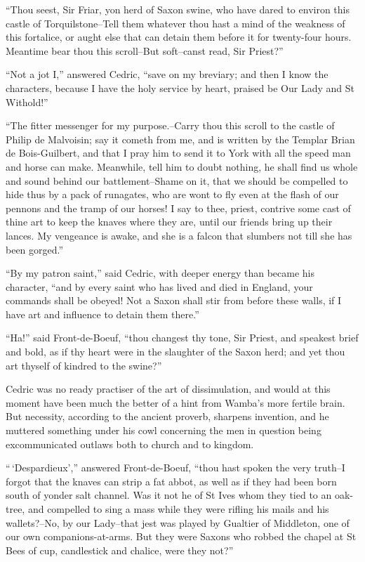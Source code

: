 ``Thou seest, Sir Friar, yon herd of Saxon swine, who have dared to
environ this castle of Torquilstone--Tell them whatever thou hast a mind
of the weakness of this fortalice, or aught else that can detain them
before it for twenty-four hours. Meantime bear thou this scroll--But
soft--canst read, Sir Priest?''

``Not a jot I,'' answered Cedric, ``save on my breviary; and then I know
the characters, because I have the holy service by heart, praised be Our
Lady and St Withold!''

``The fitter messenger for my purpose.--Carry thou this scroll to the
castle of Philip de Malvoisin; say it cometh from me, and is written by
the Templar Brian de Bois-Guilbert, and that I pray him to send it to
York with all the speed man and horse can make. Meanwhile, tell him to
doubt nothing, he shall find us whole and sound behind our
battlement--Shame on it, that we should be compelled to hide thus by a
pack of runagates, who are wont to fly even at the flash of our pennons
and the tramp of our horses! I say to thee, priest, contrive some cast
of thine art to keep the knaves where they are, until our friends bring
up their lances. My vengeance is awake, and she is a falcon that
slumbers not till she has been gorged.''

``By my patron saint,'' said Cedric, with deeper energy than became his
character, ``and by every saint who has lived and died in England, your
commands shall be obeyed! Not a Saxon shall stir from before these
walls, if I have art and influence to detain them there.''

``Ha!'' said Front-de-Boeuf, ``thou changest thy tone, Sir Priest, and
speakest brief and bold, as if thy heart were in the slaughter of the
Saxon herd; and yet thou art thyself of kindred to the swine?''

Cedric was no ready practiser of the art of dissimulation, and would at
this moment have been much the better of a hint from Wamba's more
fertile brain. But necessity, according to the ancient proverb, sharpens
invention, and he muttered something under his cowl concerning the men
in question being excommunicated outlaws both to church and to kingdom.

``\,`Despardieux','' answered Front-de-Boeuf, ``thou hast spoken the
very truth--I forgot that the knaves can strip a fat abbot, as well as
if they had been born south of yonder salt channel. Was it not he of St
Ives whom they tied to an oak-tree, and compelled to sing a mass while
they were rifling his mails and his wallets?--No, by our Lady--that jest
was played by Gualtier of Middleton, one of our own companions-at-arms.
But they were Saxons who robbed the chapel at St Bees of cup,
candlestick and chalice, were they not?''

